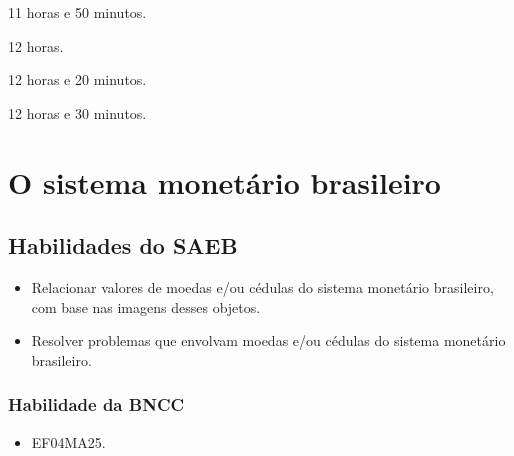 \begin{multicols}{2}
\begin{escolha}
\item
  11 horas e 50 minutos.
\item
  12 horas.
\item
  12 horas e 20 minutos.
\item
  12 horas e 30 minutos.
\end{escolha}
\end{multicols}


\chapter{O sistema monetário brasileiro}

\section*{Habilidades do SAEB}

\begin{itemize}
\item Relacionar valores de moedas e/ou cédulas do sistema monetário
brasileiro, com base nas imagens desses objetos.

\item Resolver problemas que envolvam moedas e/ou cédulas do sistema
monetário brasileiro.
\end{itemize}

\subsection{Habilidade da BNCC}

\begin{itemize}
  \item EF04MA25.
\end{itemize}

